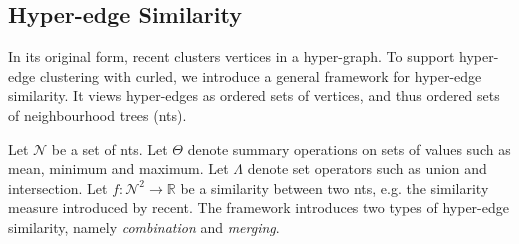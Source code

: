 



\subsection{Hyper-edge Similarity}

In its original form, \gls{recent} clusters vertices in a hyper-graph.
To support hyper-edge clustering with \gls{curled}, we introduce a general framework for hyper-edge similarity.
It views hyper-edges as ordered sets of vertices, and thus ordered sets of neighbourhood trees (\gls{nt}s).


Let $\mathcal{N}$ be a set of \gls{nt}s.
Let $\Theta$ denote summary operations on sets of values such as mean, minimum and maximum.
Let $\Lambda$ denote set operators such as union and intersection.
Let $f: \mathcal{N}^2 \rightarrow \mathbb{R}$ be a similarity between two \gls{nt}s, e.g. the similarity measure introduced by \gls{recent}.
The framework introduces two types of hyper-edge similarity, namely \textit{combination} and \textit{merging}.


